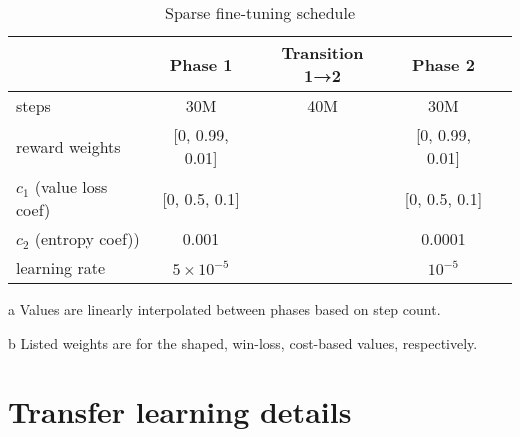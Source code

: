 \documentclass[conference,onecolumn]{IEEEtran}
\newcounter{supptable}
\newenvironment{supptable}
  {\renewcommand{\tablename}{Supplemental Table}\setcounter{table}{\value{supptable}}\addtocounter{supptable}{1}\begin{table}}
  {\end{table}\setcounter{supptable}{\value{table}}}
\begin{document}
\begin{supptable}[H]
    \centering
    \begin{threeparttable}
    \caption{Sparse fine-tuning schedule}
    \label{tab:sparse-finetuning-schedule}
    \begin{tabular}{lcccc}
    \toprule
     & Phase 1 & Transition 1→2\tnote{a} & Phase 2 \\
     \midrule
    steps & 30M & 40M & 30M \\
    reward weights\tnote{b} & [0, 0.99, 0.01] &  & [0, 0.99, 0.01] \\
    $c_1$ (value loss coef)\tnote{b} & [0, 0.5, 0.1] &  & [0, 0.5, 0.1]\\
    $c_2$ (entropy coef)) & 0.001 & & 0.0001 \\
    learning rate & $5 \times 10^{-5}$ & & $10^{-5}$ \\
    \bottomrule
    \end{tabular}
    \begin{tablenotes}
       \item[a] Values are linearly interpolated between phases based on step count.
       \item[b] Listed weights are for the shaped, win-loss, cost-based values, respectively.
    \end{tablenotes}
    \end{threeparttable}
\end{supptable}

\section{Transfer learning details}
\label{appendix:transfer-learning-details}
\end{document}
